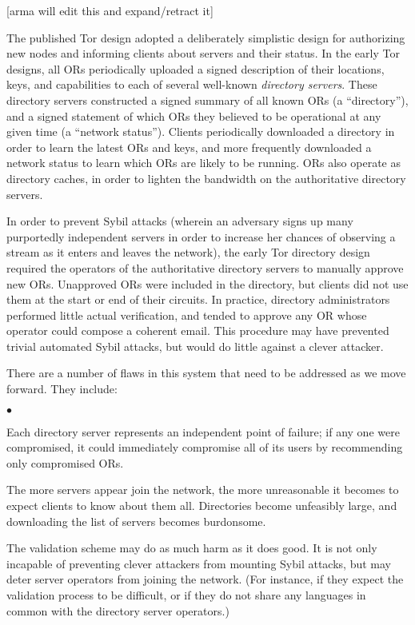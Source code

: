\documentclass{llncs}
\newenvironment{tightlist}{\begin{list}{$\bullet$}{
  \setlength{\itemsep}{0mm}
    \setlength{\parsep}{0mm}
    }}{\end{list}}
\begin{document}
[arma will edit this and expand/retract it]

The published Tor design adopted a deliberately simplistic design for
authorizing new nodes and informing clients about servers and their status.
In the early Tor designs, all ORs periodically uploaded a signed description
of their locations, keys, and capabilities to each of several well-known {\it
  directory servers}.  These directory servers constructed a signed summary
of all known ORs (a ``directory''), and a signed statement of which ORs they
believed to be operational at any given time (a ``network status'').  Clients
periodically downloaded a directory in order to learn the latest ORs and
keys, and more frequently downloaded a network status to learn which ORs are
likely to be running.  ORs also operate as directory caches, in order to
lighten the bandwidth on the authoritative directory servers.

In order to prevent Sybil attacks (wherein an adversary signs up many
purportedly independent servers in order to increase her chances of observing
a stream as it enters and leaves the network), the early Tor directory design
required the operators of the authoritative directory servers to manually
approve new ORs.  Unapproved ORs were included in the directory, but clients
did not use them at the start or end of their circuits.  In practice,
directory administrators performed little actual verification, and tended to
approve any OR whose operator could compose a coherent email.  This procedure
may have prevented trivial automated Sybil attacks, but would do little
against a clever attacker.

There are a number of flaws in this system that need to be addressed as we
move forward.  They include:
\begin{tightlist}
\item Each directory server represents an independent point of failure; if
  any one were compromised, it could immediately compromise all of its users
  by recommending only compromised ORs.
\item The more servers appear join the network, the more unreasonable it
  becomes to expect clients to know about them all.  Directories
  become unfeasibly large, and downloading the list of servers becomes
  burdonsome.
\item The validation scheme may do as much harm as it does good.  It is not
  only incapable of preventing clever attackers from mounting Sybil attacks,
  but may deter server operators from joining the network.  (For instance, if
  they expect the validation process to be difficult, or if they do not share
  any languages in common with the directory server operators.)
\end{tightlist}
\end{document}
